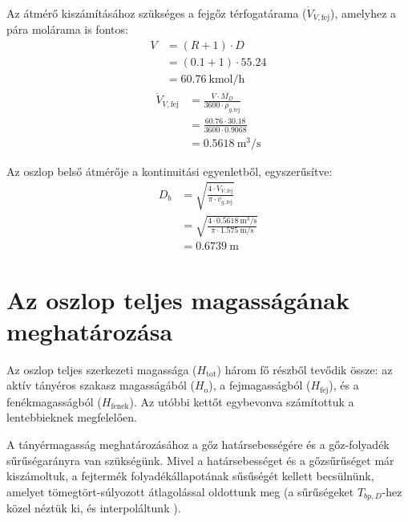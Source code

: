 Az átmérő kiszámításához szükséges a fejgőz térfogatárama
($\dot{V}_{V,\text{fej}}$), amelyhez a pára molárama is fontos:
\begin{equation}
  \begin{split}
    V &= (R+1) \cdot D\\
    &= (\num{0.1} + \num{1}) \cdot \num{55.24}\\
    &= \qty{60.76}{\kmol\per\hour}
  \end{split}
\end{equation}
\begin{equation}
  \begin{split}
    \dot{V}_{V,\text{fej}} &= \frac{V\cdot \overline{M_D}}{\num{3600}
    \cdot \rho_{g,\text{fej}}}\\
    &= \frac{ \num{60.76} \cdot \num{30.18} }{ \num{3600} \cdot
    \num{0.9068} }\\
    &= \qty{0.5618}{\cubic\metre\per\second}
  \end{split}
\end{equation}

Az oszlop belső átmérője a kontinuitási egyenletből,
egyszerűsítve\autocite{VegyipariKeszulekekSzerkesztesi1986}:
\begin{equation}
  \begin{split}
    D_b &= \sqrt{\frac{4 \cdot \dot{V}_{V,\text{fej}}}{\pi \cdot
    v_{g,\text{fej}}}}\\
    &= \sqrt{\frac{4 \cdot \qty{0.5618}{\cubic\metre\per\second}}{\pi
    \cdot \qty{1.575}{\metre\per\second}}}\\
    &= \qty{0.6739}{\metre}
  \end{split}
\end{equation}

\section{Az oszlop teljes magasságának meghatározása}

Az oszlop teljes szerkezeti magassága ($H_{\mathrm{tot}}$) három fő
részből tevődik össze: az aktív tányéros szakasz magasságából
($H_{\text{o}}$), a fejmagasságból ($H_{\text{fej}}$), és a
fenékmagasságból ($H_{\text{fenek}}$). Az utóbbi kettőt egybevonva
számítottuk a lentebbieknek megfelelően.

A tányérmagasság meghatározásához a gőz határsebességére és a
gőz-folyadék sűrűségarányra van szükségünk. Mivel a határsebességet
és a gőzsűrűséget már kiszámoltuk, a fejtermék folyadékállapotának
sűsűségét kellett becsülnünk, amelyet tömegtört-súlyozott
átlagolással oldottunk meg (a sűrűségeket \(T_{bp,D}\)-hez közel
  néztük ki, és interpoláltunk
\autocites{peterj.linstromWaterH2OInchI}{peterj.linstromNMethyl2pyrrolidoneC5H9NOInChI}).

